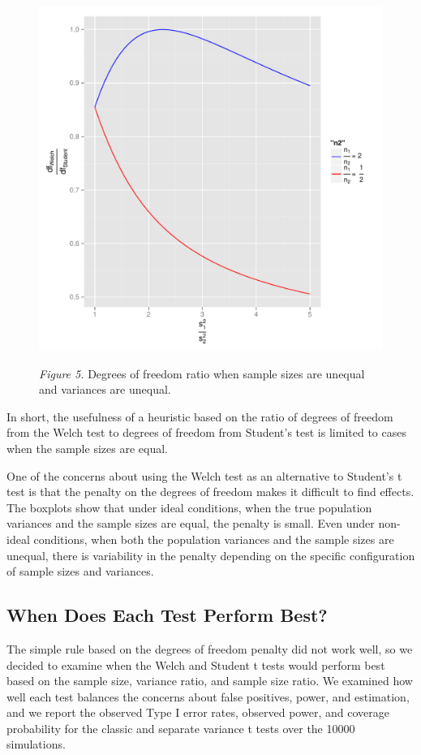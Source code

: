 \documentclass[man,a4paper,noextraspace,apacite]{apa6}\usepackage[]{graphicx}\usepackage[]{color}
\makeatletter
\def\maxwidth{ %
  \ifdim\Gin@nat@width>\linewidth
    \linewidth
  \else
    \Gin@nat@width
  \fi
}
\newenvironment{knitrout}{}{} %
\makeatother
\begin{document}
\begin{figure}
\begin{knitrout}
\color{fgcolor}
\includegraphics[width=\maxwidth]{figure/dfratiosDiffvarsDiffNratios} 

\end{knitrout}
\textit{Figure 5.} Degrees of freedom ratio when sample sizes are unequal and variances are unequal.
\end{figure}
    In short, the usefulness of a heuristic based on the ratio of degrees of freedom from the Welch test to degrees of freedom from Student's test is limited to cases when the sample sizes are equal. 

    One of the concerns about using the Welch test as an alternative to Student's t test is that the penalty on the degrees of freedom makes it difficult to find effects. The boxplots show that under ideal conditions, when the true population variances and the sample sizes are equal, the penalty is small. Even under non-ideal conditions, when both the population variances and the sample sizes are unequal, there is variability in the penalty depending on the specific configuration of sample sizes and variances.

\subsection{When Does Each Test Perform Best?}
    The simple rule based on the degrees of freedom penalty did not work well, so we decided to examine when the Welch and Student t tests would perform best based on the sample size, variance ratio, and sample size ratio. We examined how well each test balances the concerns about false positives, power, and estimation, and we report the observed Type I error rates, observed power, and coverage probability for the classic and separate variance t tests over the 10000 simulations.
\end{document}
